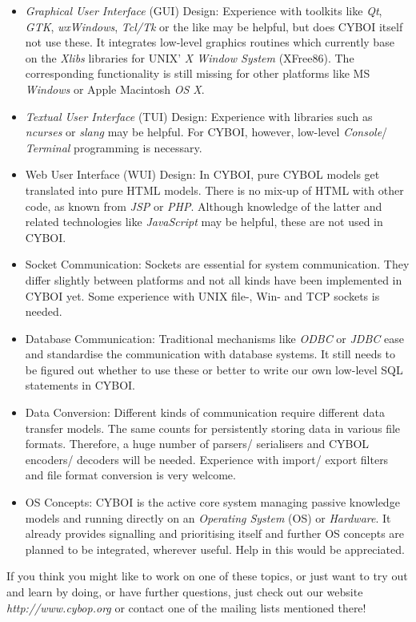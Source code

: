 \begin{itemize}
    \item[-] \emph{Graphical User Interface} (GUI) Design: Experience with
        toolkits like \emph{Qt}, \emph{GTK}, \emph{wxWindows}, \emph{Tcl/Tk} or
        the like may be helpful, but does CYBOI itself not use these. It
        integrates low-level graphics routines which currently base on the
        \emph{Xlibs} libraries for UNIX' \emph{X Window System} (XFree86). The
        corresponding functionality is still missing for other platforms like
        MS \emph{Windows} or Apple Macintosh \emph{OS X}.
    \item[-] \emph{Textual User Interface} (TUI) Design: Experience with
        libraries such as \emph{ncurses} or \emph{slang} may be helpful. For
        CYBOI, however, low-level \emph{Console}/ \emph{Terminal} programming
        is necessary.
    \item[-] Web User Interface (WUI) Design: In CYBOI, pure CYBOL models get
        translated into pure HTML models. There is no mix-up of HTML with other
        code, as known from \emph{JSP} or \emph{PHP}. Although knowledge of the
        latter and related technologies like \emph{JavaScript} may be helpful,
        these are not used in CYBOI.
    \item[-] Socket Communication: Sockets are essential for system
        communication. They differ slightly between platforms and not all kinds
        have been implemented in CYBOI yet. Some experience with UNIX file-,
        Win- and TCP sockets is needed.
    \item[-] Database Communication: Traditional mechanisms like \emph{ODBC} or
        \emph{JDBC} ease and standardise the communication with database
        systems. It still needs to be figured out whether to use these or
        better to write our own low-level SQL statements in CYBOI.
    \item[-] Data Conversion: Different kinds of communication require
        different data transfer models. The same counts for persistently
        storing data in various file formats. Therefore, a huge number of
        parsers/ serialisers and CYBOL encoders/ decoders will be needed.
        Experience with import/ export filters and file format conversion is
        very welcome.
    \item[-] OS Concepts: CYBOI is the active core system managing passive
        knowledge models and running directly on an \emph{Operating System}
        (OS) or \emph{Hardware}. It already provides signalling and
        prioritising itself and further OS concepts are planned to be
        integrated, wherever useful. Help in this would be appreciated.
\end{itemize}

If you think you might like to work on one of these topics, or just want to try
out and learn by doing, or have further questions, just check out our website
\emph{http://www.cybop.org} or contact one of the mailing lists mentioned there!
